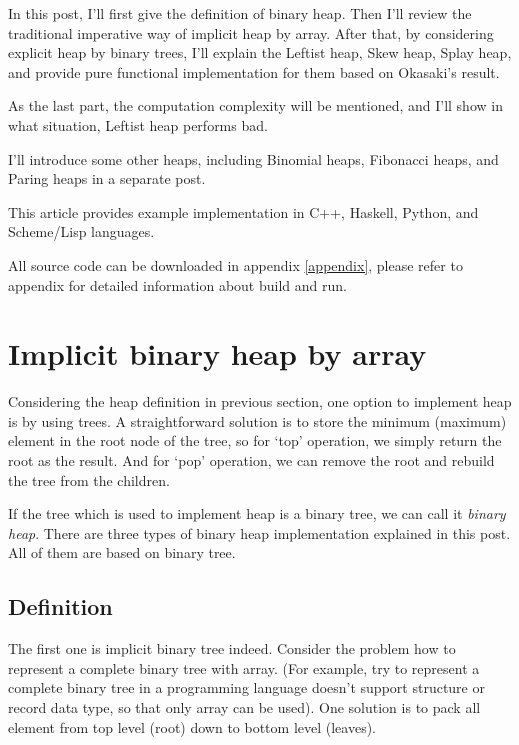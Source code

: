 \documentclass{article}
\begin{document}
In this post, I'll first give the definition of binary heap. Then
I'll review the traditional imperative way of implicit heap by array.
After that, by considering explicit heap by binary trees, I'll
explain the Leftist heap, Skew heap, Splay heap, and provide pure functional implementation
for them based on Okasaki's result\cite{okasaki-book}.

As the last part, the computation complexity will be mentioned, and
I'll show in what situation, Leftist heap performs bad.

I'll introduce some other heaps, including Binomial heaps, Fibonacci
heaps, and Paring heaps in a separate post.

This article provides example implementation in C++, Haskell, Python, and 
Scheme/Lisp languages. 

All source code can be downloaded in appendix \ref{appendix}, please 
refer to appendix for detailed information about build and run.


\section{Implicit binary heap by array}
\label{ibheap}

Considering the heap definition in previous section, one option to 
implement heap is by using trees. A straightforward solution is
to store the minimum (maximum) element in the root node of the 
tree, so for `top' operation, we simply return the root as the
result. And for `pop' operation, we can remove the root and 
rebuild the tree from the children.

If the tree which is used to implement heap is a binary tree, we
can call it {\em binary heap}. There are three types of binary
heap implementation explained in this post. All of them are
based on binary tree.

\subsection{Definition}

The first one is implicit binary tree indeed. Consider the problem
how to represent a complete binary tree with array. (For example, try to 
represent a complete binary tree in a programming language doesn't support structure
or record data type, so that only array can be used). One solution
is to pack all element from top level (root) down to bottom level (leaves).
\end{document}
